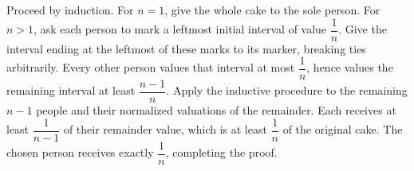 Proceed by induction. For $n=1$, give the whole cake to the sole person. For $n>1$, ask each person to mark a leftmost initial interval of value $\dfrac{1}{n}$. Give the interval ending at the leftmost of these marks to its marker, breaking ties arbitrarily. Every other person values that interval at most $\dfrac{1}{n}$, hence values the remaining interval at least $\dfrac{n-1}{n}$. Apply the inductive procedure to the remaining $n-1$ people and their normalized valuations of the remainder. Each receives at least $\dfrac{1}{n-1}$ of their remainder value, which is at least $\dfrac{1}{n}$ of the original cake. The chosen person receives exactly $\dfrac{1}{n}$, completing the proof.
